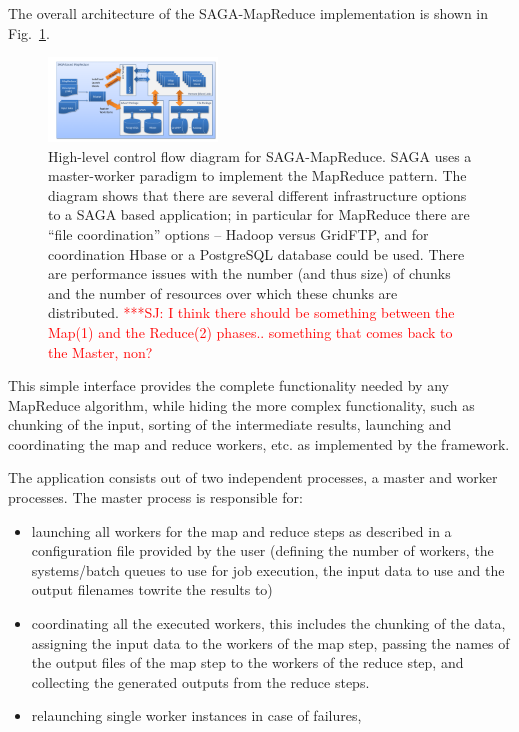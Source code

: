 \documentclass[conference,final]{IEEEtran}
\newcommand{\jhanote}[1]{ {\textcolor{red} { ***SJ: #1 }}}
\newcommand{\jhanote}[1]{}
\begin{document}
The overall architecture of the SAGA-MapReduce implementation is shown
in Fig.~\ref{saga-mapreduce_controlflow}. 
\begin{figure}[t]
      \centering
          \includegraphics[width=0.4\textwidth]{saga-mapreduce_controlflow.png}
          \caption{High-level control flow diagram for
            SAGA-MapReduce. SAGA uses a master-worker paradigm to
            implement the MapReduce pattern. The diagram shows that
            there are several different infrastructure options to a
            SAGA based application; in particular for MapReduce there
            are ``file coordination'' options -- Hadoop versus
            GridFTP, and for coordination Hbase or a PostgreSQL
            database could be used. There are performance issues with
            the number (and thus size) of chunks and the number of
            resources over which these chunks are distributed.
            \jhanote{I think there should be something between the
              Map(1) and the Reduce(2) phases.. something that comes
              back to the Master, non?}}
      \label{saga-mapreduce_controlflow}
\end{figure}

This simple interface provides the complete functionality needed by
any MapReduce algorithm, while hiding the more complex functionality,
such as chunking of the input, sorting of the intermediate results,
launching and coordinating the map and reduce workers, etc. as
implemented by the framework.

The application consists out of two independent processes, a master
and worker processes. The master process is responsible for:

\begin{itemize}
\item launching all workers for the map and reduce steps as described
  in a configuration file provided by the user (defining the number of
  workers, the systems/batch queues to use for job execution, the
  input data to use and the output filenames towrite the results to)
\item coordinating all the executed workers, this includes the
  chunking of the data, assigning the input data to the workers of the
  map step, passing the names of the output files of the map step to
  the workers of the reduce step, and collecting the generated outputs
  from the reduce steps.
\item relaunching single worker instances in case of failures,
\end{itemize}
\end{document}
